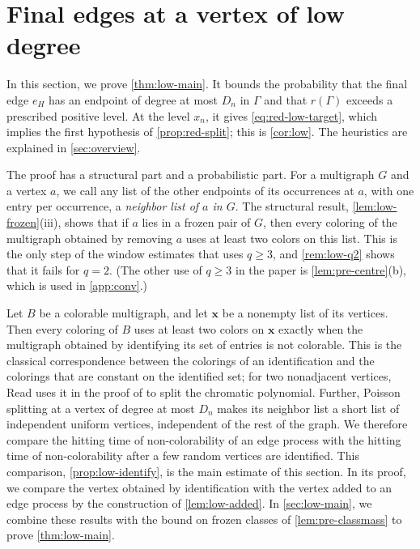 \chapter{Final edges at a vertex of low degree}\label{sec:low}

In this section, we prove \cref{thm:low-main}. It bounds the probability that the final edge $e_H$ has an endpoint of degree at most $D_n$ in $\Gamma$ and that $r(\Gamma)$ exceeds a prescribed positive level. At the level $x_n$, it gives \eqref{eq:red-low-target}, which implies the first hypothesis of \cref{prop:red-split}; this is \cref{cor:low}. The heuristics are explained in \cref{sec:overview}.

The proof has a structural part and a probabilistic part. For a multigraph $G$ and a vertex $a$, we call any list of the other endpoints of its occurrences at $a$, with one entry per occurrence, a \emph{neighbor list of $a$ in $G$}. The structural result, \cref{lem:low-frozen}(iii), shows that if $a$ lies in a frozen pair of $G$, then every coloring of the multigraph obtained by removing $a$ uses at least two colors on this list. This is the only step of the window estimates that uses $q \ge 3$, and \cref{rem:low-q2} shows that it fails for $q = 2$. (The other use of $q \ge 3$ in the paper is \cref{lem:pre-centre}(b), which is used in \cref{app:conv}.)

Let $B$ be a colorable multigraph, and let $\mathbf x$ be a nonempty list of its vertices. Then every coloring of $B$ uses at least two colors on $\mathbf x$ exactly when the multigraph obtained by identifying its set of entries is not colorable. This is the classical correspondence between the colorings of an identification and the colorings that are constant on the identified set; for two nonadjacent vertices, Read uses it in the proof of \cite[Section~3, Theorem~1]{read1968introduction} to split the chromatic polynomial. Further, Poisson splitting at a vertex of degree at most $D_n$ makes its neighbor list a short list of independent uniform vertices, independent of the rest of the graph. We therefore compare the hitting time of non-colorability of an edge process with the hitting time of non-colorability after a few random vertices are identified. This comparison, \cref{prop:low-identify}, is the main estimate of this section. In its proof, we compare the vertex obtained by identification with the vertex added to an edge process by the construction of \cref{lem:low-added}. In \cref{sec:low-main}, we combine these results with the bound on frozen classes of \cref{lem:pre-classmass} to prove \cref{thm:low-main}.

